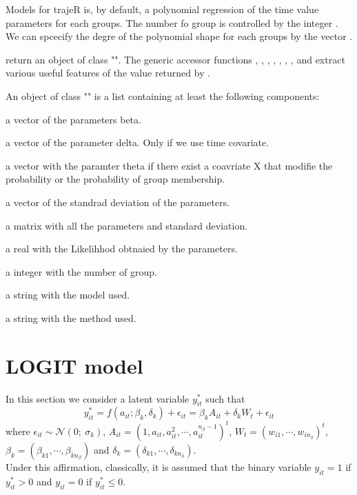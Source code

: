 \documentclass{article}\usepackage[]{graphicx}\usepackage[]{color}
\newenvironment{Arg}{%
\begin{Rdsection}{}}{\end{Rdsection}}
\begin{document}
\begin{Details}\relax
	Models for trajeR is, by default, a polynomial regression of the time value parameters for each groups. The number fo group is controlled by the integer .
	We can spcecify the degre of the polynomial shape for each groups by the vector .
\end{Details}
%
\begin{Value}
	return an object of class "".
	The generic accessor functions , , , , , ,
	,  and  extract various useful features of the value returned by .

	An object of class "" is a list containing at least the following components:
\end{Value}
	\begin{Arg}
	\begin{ldescription}

		\item[\code{beta}] a vector of the parameters beta.
		\item[\code{delta}] a vector of the parameter delta. Only if we use time covariate.
		\item[\code{theta}] a vector with the paramter theta if there exist a coavriate X that modifie
		the probability or the probability of group membership.
		\item[\code{sd}] a vector of the standrad deviation of the parameters.
		\item[\code{tab}] a matrix with all the parameters and standard deviation.
		\item[\code{Likelihood}] a real with the Likelihhod obtnaied by the parameters.
		\item[\code{ng}] a integer with the number of group.
		\item[\code{model}] a string with the model used.
		\item[\code{method}] a string with the method used.

	\end{ldescription}
\end{Arg}

\section{LOGIT model}
In this section we consider a latent variable $y^*_{it}$ such that
\begin{equation}
y^*_{it} = f(a_{it}; \beta_k, \delta_k)+\epsilon_{it} =\beta_k A_{it}+\delta_k W_t+\epsilon_{it}
\end{equation}
where $\epsilon_{it}\sim \mathcal{N}\left(0;\ \sigma_k\right)$,  $A_{it}=(1,a_{it},a_{it}^2,\cdots,a_{it}^{n_\beta-1})^t $, $W_t=(w_{i1},\cdots,w_{in_\delta})^t $, $\beta_k =(\beta_{k1},\cdots, \beta_{kn_\beta})$ and $\delta_k=(\delta_{k1},\cdots,\delta_{kn_\delta}) $.\\
Under this affirmation, classically, it is assumed that the binary variable $y_{it}=1$ if $y^*_{it}>0$ and $y_{it}=0$ if $y^*_{it}\leq 0$.\\
\end{document}
